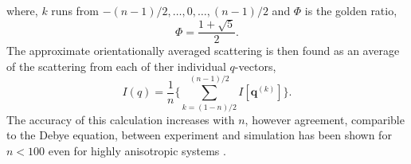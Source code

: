 %
where, $k$ runs from $-(n-1)/2,\ldots,0,\ldots,(n-1)/2$ and $\Phi$ is the golden ratio,
%
\begin{equation}
    \Phi = \frac{1+\sqrt{5}}{2}.
\end{equation}
%
The approximate orientationally averaged scattering is then found as an average of the scattering from each of ther individual $q$-vectors,
%
\begin{equation}
    I(q) = \frac{1}{n}\Bigg\{\sum_{k=(1-n)/2}^{(n-1)/2} I[\mathbf{q}^{(k)}]\Bigg\}.
\end{equation}
%
The accuracy of this calculation increases with $n$, however agreement, comparible to the Debye equation, between experiment and simulation has been shown for $n < 100$ even for highly anisotropic systems \cite{watson_rapid_2013}.



%
%

